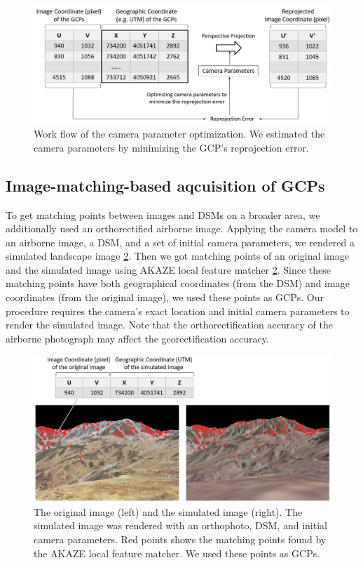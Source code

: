 \documentclass{article}
\begin{document}
\begin{figure}
\includegraphics[width=1\linewidth]{paper_files/figures/Slide5} \caption{Work flow of the camera parameter optimization. We estimated the camera parameters by minimizing the GCP's reprojection error.}\label{fig:optim}
\end{figure}

\hypertarget{image-matching-based-aqcuisition-of-gcps}{%
\subsection{Image-matching-based aqcuisition of GCPs}\label{image-matching-based-aqcuisition-of-gcps}}

To get matching points between images and DSMs on a broader area, we additionally used an orthorectified airborne image. Applying the camera model to an airborne image, a DSM, and a set of initial camera parameters, we rendered a simulated landscape image \ref{fig:matched}. Then we got matching points of an original image and the simulated image using AKAZE local feature matcher \ref{fig:matched}. Since these matching points have both geographical coordinates (from the DSM) and image coordinates (from the original image), we used these points as GCPs. Our procedure requires the camera's exact location and initial camera parameters to render the simulated image. Note that the orthorectification accuracy of the airborne photograph may affect the georectification accuracy.



\begin{figure}
\includegraphics[width=1\linewidth]{paper_files/figures/Slide4} \caption{The original image (left) and the simulated image (right). The simulated image was rendered with an orthophoto, DSM, and initial camera parameters. Red points shows the matching points found by the AKAZE local feature matcher. We used these points as GCPs.}\label{fig:matched}
\end{figure}
\end{document}

